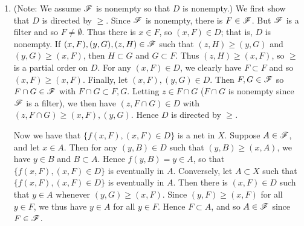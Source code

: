 \begin{prob}[Filters]
\begin{enumerate}
\begin{enumerate}
\item (Note: We assume $\mathscr{F}$ is nonempty so that $D$ is nonempty.) We first show that $D$ is directed by $\geq$. Since $\mathscr{F}$ is nonempty, there is $F \in \mathscr{F}$. But $\mathscr{F}$ is a filter and so $F \not = \emptyset$. Thus there is $x \in F$, so $(x, F) \in D$; that is, $D$ is nonempty. If $(x, F), (y, G), (z, H) \in \mathscr{F}$ such that $(z, H) \geq (y, G)$ and $(y, G) \geq (x, F)$, then $H \subset G$ and $G \subset F$. Thus $(z, H) \geq (x, F)$, so $\geq$ is a partial order on $D$. For any $(x, F) \in D$, we clearly have $F \subset F$ and so $(x, F) \geq (x, F)$. Finally, let $(x, F), (y, G) \in D$. Then $F, G \in \mathscr{F}$ so $F\cap G \in \mathscr{F}$ with $F\cap G \subset F, G$. Letting $z \in F\cap G$ ($F\cap G$ is nonempty since $\mathscr{F}$ is a filter), we then have $(z, F\cap G) \in D$ with $(z, F\cap G) \geq (x, F), (y, G)$. Hence $D$ is directed by $\geq$.

Now we have that $\{f(x, F), (x, F) \in D\}$ is a net in $X$. Suppose $A \in \mathscr{F}$, and let $x \in A$. Then for any $(y, B) \in D$ such that $(y, B) \geq (x, A)$, we have $y \in B$ and $B \subset A$. Hence $f(y, B) = y \in A$, so that $\{f(x, F), (x, F) \in D\}$ is eventually in $A$. Conversely, let $A \subset X$ such that $\{f(x, F), (x, F) \in D\}$ is eventually in $A$. Then there is $(x, F) \in D$ such that $y \in A$ whenever $(y, G) \geq (x, F)$. Since $(y, F) \geq (x, F)$ for all $y \in F$, we thus have $y \in A$ for all $y \in F$. Hence $F \subset A$, and so $A \in \mathscr{F}$ since $F \in \mathscr{F}$.
\end{enumerate}
\end{enumerate}
\end{prob}